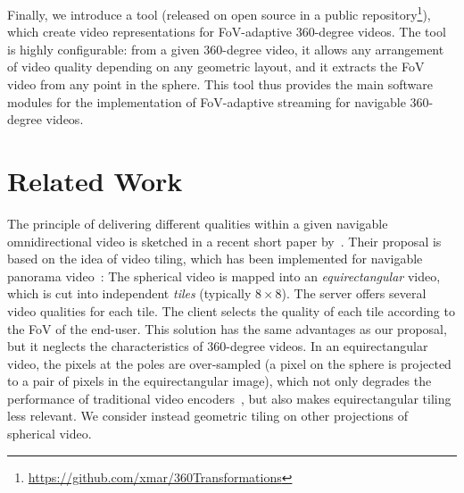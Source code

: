 Finally, we introduce a tool (released on open source in a public
repository\footnote{\url{https://github.com/xmar/360Transformations}}),
which create video representations for
\ac{FoV}-adaptive 360-degree videos.
The tool is highly configurable: from a given 360-degree video, it allows
any arrangement of video quality depending on any geometric layout, and it
extracts the
\ac{FoV} video from any point in the sphere. This tool thus provides the
main software modules for the implementation of \ac{FoV}-adaptive streaming
for navigable 360-degree videos.


\section{Related Work}
\label{sec:relatedwork}

The principle of delivering different qualities within a given navigable
omnidirectional video is sketched
in a recent short paper by~\citet{ochi_live_2015}. Their proposal is based on the idea of video
tiling, which has been implemented for navigable panorama
video~\cite{sanchez_compressed_2015,wang_mixing_2014,gaddam_tiling_2015}:
The spherical video is mapped into an \emph{equirectangular} video, which
is cut into independent \emph{tiles} (typically $8\times 8$). The server offers several
video qualities for each tile. The client selects the quality of each tile according to
the \ac{FoV} of the end-user. This
solution has the same advantages as our proposal, but it neglects
the characteristics of 360-degree
videos. In an equirectangular video, the pixels
at the poles are over-sampled (a pixel on the sphere is projected to a pair of pixels in the equirectangular image), which not only degrades the
performance of traditional video encoders~\cite{wojciechowski_h.264_2006,yu_framework_2015}, but also
makes equirectangular tiling less relevant. We consider instead geometric tiling on
other projections of spherical video.

